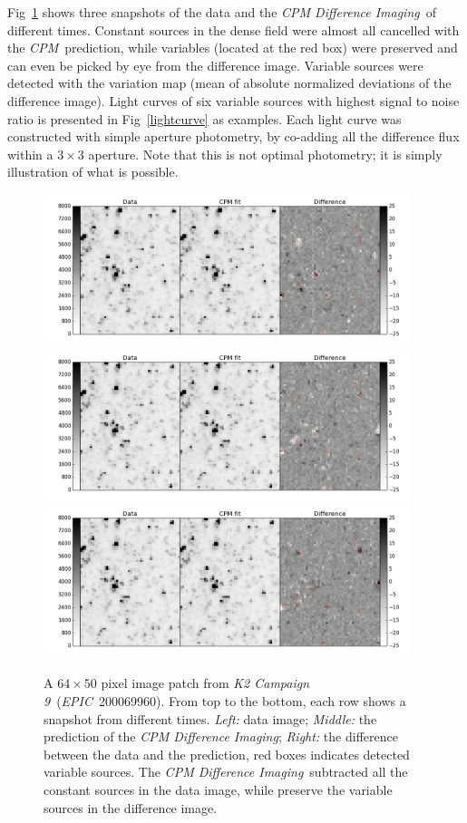 \documentclass[12pt, preprint]{aastex}
\newcommand{\project}[1]{\textsl{#1}}
\newcommand{\cpm}{\project{CPM}}
\newcommand{\cpmdiff}{\project{CPM Difference Imaging}}
\newcommand{\KTCN}{\project{K2 Campaign 9}}
\newcommand{\epic}{\project{EPIC}}
\begin{document}
Fig~\ref{k2c9} shows three snapshots of the data and the \cpmdiff\ of different times.
Constant sources in the dense field were almost all cancelled with the \cpm\ prediction, while variables (located at the red box) were preserved and can even be picked by eye from the difference image.
Variable sources were detected with the variation map (mean of absolute normalized deviations of the difference image). 
Light curves of six variable sources with highest signal to noise ratio is presented in Fig~\ref{lightcurve} as examples. 
Each light curve was constructed with simple aperture photometry, by co-adding all the difference flux within a $3 \times 3$ aperture. Note that this is not optimal photometry; it is simply illustration of what is possible.

\begin{figure}[p]
\begin{center}
\includegraphics[width=0.95\textwidth]{f3a}
\includegraphics[width=0.95\textwidth]{f3b}
\includegraphics[width=0.95\textwidth]{f3c}
\end{center}
\caption{
  \label{k2c9}
  A $64\times 50$ pixel image patch from \KTCN\ (\epic\ 200069960). From top to the bottom,  each row shows a snapshot from different times.
  \emph{Left:} data image;
  \emph{Middle:} the prediction of the \cpmdiff;
  \emph{Right:} the difference between the data and the prediction, red boxes indicates detected variable sources.  
  The \cpmdiff\ subtracted all the constant sources in the data image, while preserve the variable sources in the difference image.
}
\end{figure}
\end{document}
